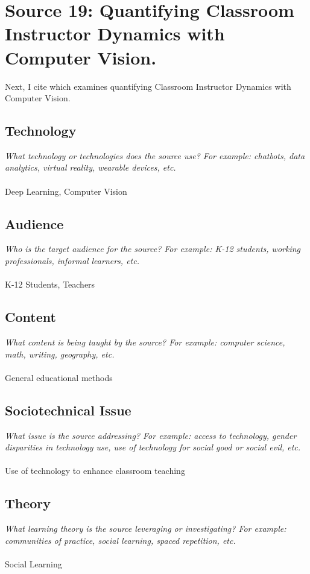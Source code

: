 \documentclass[12pt, final]{article}
\begin{document}
\section{Source 19: Quantifying Classroom Instructor Dynamics with Computer Vision.}
\label{Source 19}

Next, I cite \cite{Bosch} which examines quantifying Classroom Instructor Dynamics with Computer Vision.

\subsection{Technology}
\textit{What technology or technologies does the source use? For example: chatbots, data analytics, virtual reality, wearable devices, etc.}
\\
\\
Deep Learning, Computer Vision

\subsection{Audience}
\textit{Who is the target audience for the source? For example: K-12 students, working professionals, informal learners, etc.}
\\
\\
K-12 Students, Teachers

\subsection{Content}
\textit{What content is being taught by the source? For example: computer science, math, writing, geography, etc.}
\\
\\
General educational methods

\subsection{Sociotechnical Issue}
\textit{What issue is the source addressing? For example: access to technology, gender disparities in technology use, use of technology for social good or social evil, etc.}
\\
\\
Use of technology to enhance classroom teaching

\subsection{Theory}
\textit{What learning theory is the source leveraging or investigating? For example: communities of practice, social learning, spaced repetition, etc.}
\\
\\
Social Learning
\end{document}

